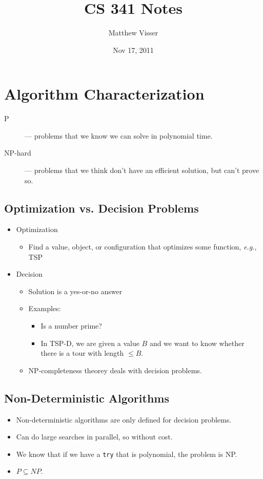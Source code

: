 \documentclass[12pt]{article}
\begin{document}
\title{CS 341 Notes}
\author{Matthew Visser}
\date{Nov 17, 2011}
\maketitle

\section{Algorithm Characterization}

\begin{description}
	\item[P] --- problems that we know we can solve in polynomial time.
	\item[NP-hard] --- problems that we think don't have an efficient solution,
		but can't prove so.
\end{description}

\subsection{Optimization vs. Decision Problems}

\begin{itemize}
	\item Optimization
		\begin{itemize}
			\item Find a value, object, or configuration that optimizes some
				function, \textit{e.g.}, TSP
		\end{itemize}
	\item Decision
		\begin{itemize}
			\item Solution is a yes-or-no answer
			\item Examples:
				\begin{itemize}
					\item Is a number prime?
					\item In TSP-D, we are given a value $B$ and we want to know
						whether there is a tour with length $\le B$.
				\end{itemize}
			\item NP-completeness theorey deals with decision problems.
		\end{itemize}
\end{itemize}

\subsection{Non-Deterministic Algorithms}

\begin{itemize}
	\item Non-deterministic algorithms are only defined for decision problems.
	\item Can do large searches in parallel, so without cost.
	\item We know that if we have a \texttt{try} that is polynomial, the problem
		is NP.
	\item $P \subseteq NP$.
\end{itemize}
\end{document}
